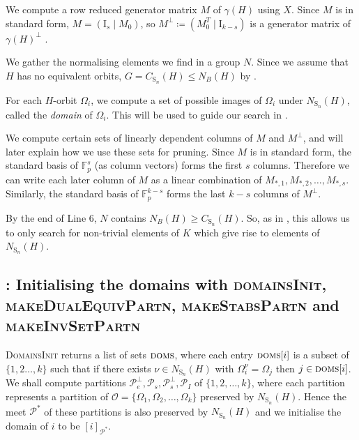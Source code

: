 \documentclass[11pt,a4paper]{article}
\theoremstyle{definition}
\theoremstyle{remark}
\newcommand{\Sy}{\mathrm{S}}
\begin{document}
\begin{description} \setlength{\itemsep}{0pt}

\item[Lines 4--5] We compute a row reduced generator matrix $M$ of $\gamma(H)$ using $X$. Since $M$ is in standard form, $M = (\mathrm{I}_s \mid M_0)$, so $M^{\bot} \coloneqq (M_0^{T} \mid \mathrm{I}_{k-s})$ is a generator matrix of $\gamma(H)^{\bot}$ \cite{lintCoding}. 

\item[Line 6] We gather the normalising elements we find in a group $N$. Since we assume that $H$ has no equivalent orbits, $G = C_{\Sy_n}(H) \leq N_B(H)$ by .

\item[Line 7] For each $H$-orbit $\Omega_i$, we compute a set of possible images of $\Omega_i$ under $N_{\Sy_n}(H)$, called the \emph{domain} of $\Omega_i$. This will be used to guide our search in .

\item[Lines 8--9] We compute certain sets of linearly dependent columns of $M$ and $M^{\bot}$, and will later explain how we use these sets for pruning. 
Since $M$ is in standard form, the standard basis of $\mathds{F}_p^{s}$ (as column vectors) forms the first $s$ columns. Therefore we can write each later column of $M$ as a linear combination of $M_{*,1}, M_{*,2}, \ldots, M_{*,s}$. 
Similarly, the standard basis of $\mathds{F}_p^{{k-s}}$ forms the last $k-s$ columns of $M^{\bot}$.
\end{description}

By the end of Line 6, $N$ contains $N_B(H) \geq C_{\Sy_n}(H)$.
So, as in , this allows us to only search for non-trivial elements of $K$ which give rise to elements of $N_{\Sy_n}(H)$.

\subsection*{: Initialising the domains with \textsc{domainsInit}, \textsc{makeDualEquivPartn}, \textsc{makeStabsPartn} and \textsc{makeInvSetPartn}}
\label{subsection: domain init}

\textsc{DomainsInit} returns a list of sets $\textsc{doms}$, where each entry $\textsc{doms}[i]$ is a subset of $\{1,2 \ldots, k\}$ such that if there exists $\nu \in N_{\Sy_n}(H)$ with $\Omega_i^\nu = \Omega_j$ then $j \in \textsc{doms}[i]$.
We shall compute partitions $\mathcal{P}_e^{\bot}, 
\mathcal{P}_s, \mathcal{P}_s^{\bot}, \mathcal{P}_I$ of $\{1,2, \ldots, k \}$, where each partition represents a partition of $\mathcal{O} = \{ \Omega_1, \Omega_2, \ldots, \Omega_k \}$ preserved by $N_{\Sy_n}(H)$. Hence the meet $\mathcal{P}^*$ of these partitions is also preserved by $N_{\Sy_n}(H)$ and we initialise the domain of $i$ to be $[i]_{\mathcal{P}^*}$. 
\end{document}
